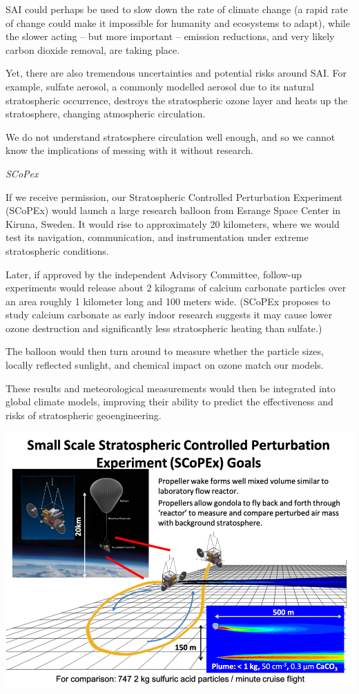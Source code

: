 \documentclass[
]{book}
\begin{document}
SAI could perhaps be used to slow down the rate of climate change (a rapid rate of change could make it impossible for humanity and ecosystems to adapt), while the slower acting -- but more important -- emission reductions, and very likely carbon dioxide removal, are taking place.

Yet, there are also tremendous uncertainties and potential risks around SAI. For example, sulfate aerosol, a commonly modelled aerosol due to its natural stratospheric occurrence, destroys the stratospheric ozone layer and heats up the stratosphere, changing atmospheric circulation.

We do not understand stratosphere circulation well enough, and so we cannot know the implications of messing with it without research.

\emph{SCoPex}

If we receive permission, our Stratospheric Controlled Perturbation Experiment (SCoPEx) would launch a large research balloon from Esrange Space Center in Kiruna, Sweden. It would rise to approximately 20 kilometers, where we would test its navigation, communication, and instrumentation under extreme stratospheric conditions.

Later, if approved by the independent Advisory Committee, follow-up experiments would release about 2 kilograms of calcium carbonate particles over an area roughly 1 kilometer long and 100 meters wide. (SCoPEx proposes to study calcium carbonate as early indoor research suggests it may cause lower ozone destruction and significantly less stratospheric heating than sulfate.)

The balloon would then turn around to measure whether the particle sizes, locally reflected sunlight, and chemical impact on ozone match our models.

These results and meteorological measurements would then be integrated into global climate models, improving their ability to predict the effectiveness and risks of stratospheric geoengineering.

\includegraphics{fig/Scopex-Picture.png}
\end{document}

